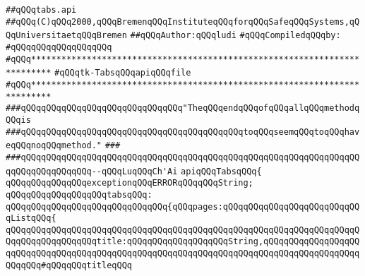 \label{src/lib/tk/src/toolkit/tabs.api}
\verb|##qQQqtabs.api|\newline
\verb|##qQQq(C)qQQq2000,qQQqBremenqQQqInstituteqQQqforqQQqSafeqQQqSystems,qQQqUniversitaetqQQqBremen|\newline
\verb|##qQQqAuthor:qQQqludi|\newline
\newline
\verb|#qQQqCompiledqQQqby:|\newline
\verb|#qQQqqQQqqQQqqQQqqQQq|\newline
\newline
\newline
\newline
\verb|#qQQq**************************************************************************|\newline
\verb|#qQQqtk-TabsqQQqapiqQQqfile|\newline
\verb|#qQQq**************************************************************************|\newline
\newline
\newline
\newline
\verb|###qQQqqQQqqQQqqQQqqQQqqQQqqQQqqQQq"TheqQQqendqQQqofqQQqallqQQqmethodqQQqis|\newline
\verb|###qQQqqQQqqQQqqQQqqQQqqQQqqQQqqQQqqQQqqQQqqQQqtoqQQqseemqQQqtoqQQqhaveqQQqnoqQQqmethod."|\newline
\verb|###|\newline
\verb|###qQQqqQQqqQQqqQQqqQQqqQQqqQQqqQQqqQQqqQQqqQQqqQQqqQQqqQQqqQQqqQQqqQQqqQQqqQQqqQQqqQQq--qQQqLuqQQqCh'Ai|\newline
\newline
\newline
\newline
\verb|apiqQQqTabsqQQq{|\newline
\newline
\verb|qQQqqQQqqQQqqQQqexceptionqQQqERRORqQQqqQQqString;|\newline
\newline
\verb|qQQqqQQqqQQqqQQqqQQqtabsqQQq:|\newline
\verb|qQQqqQQqqQQqqQQqqQQqqQQqqQQqqQQq{qQQqpages:qQQqqQQqqQQqqQQqqQQqqQQqqQQqListqQQq{|\newline
\verb|qQQqqQQqqQQqqQQqqQQqqQQqqQQqqQQqqQQqqQQqqQQqqQQqqQQqqQQqqQQqqQQqqQQqqQQqqQQqqQQqqQQqqQQqtitle:qQQqqQQqqQQqqQQqqQQqString,qQQqqQQqqQQqqQQqqQQqqQQqqQQqqQQqqQQqqQQqqQQqqQQqqQQqqQQqqQQqqQQqqQQqqQQqqQQqqQQqqQQqqQQqqQQqqQQq#qQQqqQQqtitleqQQq|\newline
